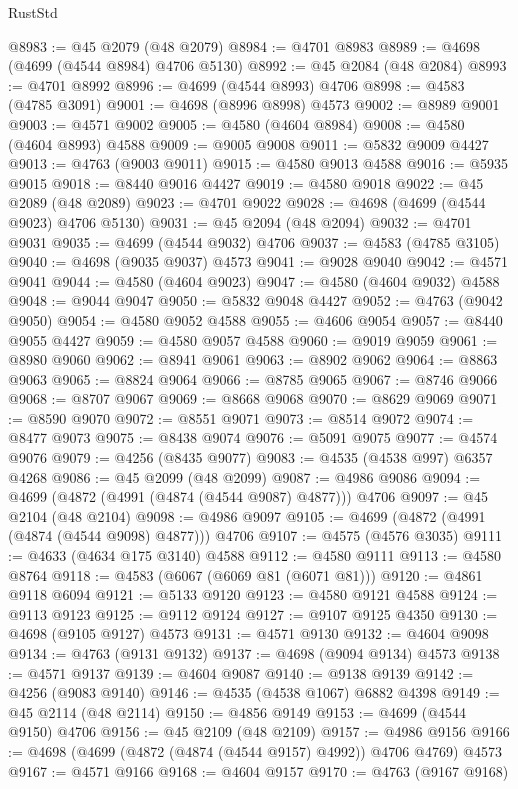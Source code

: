 \begin{lexlean}{RustStd}
\begin{coremodule}
@8983 := @45 @2079 (@48 @2079)
@8984 := @4701 @8983
@8989 := @4698 (@4699 (@4544 @8984) @4706 @5130)
@8992 := @45 @2084 (@48 @2084)
@8993 := @4701 @8992
@8996 := @4699 (@4544 @8993) @4706
@8998 := @4583 (@4785 @3091)
@9001 := @4698 (@8996 @8998) @4573
@9002 := @8989 @9001
@9003 := @4571 @9002
@9005 := @4580 (@4604 @8984)
@9008 := @4580 (@4604 @8993) @4588
@9009 := @9005 @9008
@9011 := @5832 @9009 @4427
@9013 := @4763 (@9003 @9011)
@9015 := @4580 @9013 @4588
@9016 := @5935 @9015
@9018 := @8440 @9016 @4427
@9019 := @4580 @9018
@9022 := @45 @2089 (@48 @2089)
@9023 := @4701 @9022
@9028 := @4698 (@4699 (@4544 @9023) @4706 @5130)
@9031 := @45 @2094 (@48 @2094)
@9032 := @4701 @9031
@9035 := @4699 (@4544 @9032) @4706
@9037 := @4583 (@4785 @3105)
@9040 := @4698 (@9035 @9037) @4573
@9041 := @9028 @9040
@9042 := @4571 @9041
@9044 := @4580 (@4604 @9023)
@9047 := @4580 (@4604 @9032) @4588
@9048 := @9044 @9047
@9050 := @5832 @9048 @4427
@9052 := @4763 (@9042 @9050)
@9054 := @4580 @9052 @4588
@9055 := @4606 @9054
@9057 := @8440 @9055 @4427
@9059 := @4580 @9057 @4588
@9060 := @9019 @9059
@9061 := @8980 @9060
@9062 := @8941 @9061
@9063 := @8902 @9062
@9064 := @8863 @9063
@9065 := @8824 @9064
@9066 := @8785 @9065
@9067 := @8746 @9066
@9068 := @8707 @9067
@9069 := @8668 @9068
@9070 := @8629 @9069
@9071 := @8590 @9070
@9072 := @8551 @9071
@9073 := @8514 @9072
@9074 := @8477 @9073
@9075 := @8438 @9074
@9076 := @5091 @9075
@9077 := @4574 @9076
@9079 := @4256 (@8435 @9077)
@9083 := @4535 (@4538 @997) @6357 @4268
@9086 := @45 @2099 (@48 @2099)
@9087 := @4986 @9086
@9094 := @4699 (@4872 (@4991 (@4874 (@4544 @9087) @4877))) @4706
@9097 := @45 @2104 (@48 @2104)
@9098 := @4986 @9097
@9105 := @4699 (@4872 (@4991 (@4874 (@4544 @9098) @4877))) @4706
@9107 := @4575 (@4576 @3035)
@9111 := @4633 (@4634 @175 @3140) @4588
@9112 := @4580 @9111
@9113 := @4580 @8764
@9118 := @4583 (@6067 (@6069 @81 (@6071 @81)))
@9120 := @4861 @9118 @6094
@9121 := @5133 @9120
@9123 := @4580 @9121 @4588
@9124 := @9113 @9123
@9125 := @9112 @9124
@9127 := @9107 @9125 @4350
@9130 := @4698 (@9105 @9127) @4573
@9131 := @4571 @9130
@9132 := @4604 @9098
@9134 := @4763 (@9131 @9132)
@9137 := @4698 (@9094 @9134) @4573
@9138 := @4571 @9137
@9139 := @4604 @9087
@9140 := @9138 @9139
@9142 := @4256 (@9083 @9140)
@9146 := @4535 (@4538 @1067) @6882 @4398
@9149 := @45 @2114 (@48 @2114)
@9150 := @4856 @9149
@9153 := @4699 (@4544 @9150) @4706
@9156 := @45 @2109 (@48 @2109)
@9157 := @4986 @9156
@9166 := @4698 (@4699 (@4872 (@4874 (@4544 @9157) @4992)) @4706 @4769) @4573
@9167 := @4571 @9166
@9168 := @4604 @9157
@9170 := @4763 (@9167 @9168)

\end{coremodule}
\end{lexlean}
